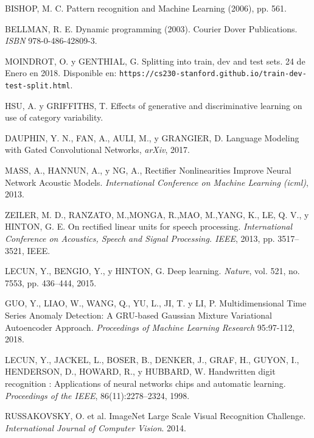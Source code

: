 \begin{thebibliography}{9}
BISHOP, M. C. Pattern recognition and Machine Learning (2006), pp. 561.

 BELLMAN, R. E. Dynamic programming (2003). Courier Dover Publications. \textit{ISBN} 978-0-486-42809-3.

 MOINDROT, O. y GENTHIAL, G. Splitting into train, dev and test sets. 24 de Enero en 2018. Disponible en: \texttt{https://cs230-stanford.github.io/train-dev-test-split.html}.

 HSU, A. y GRIFFITHS, T. Effects of generative and discriminative learning on use of category variability.

 DAUPHIN, Y. N., FAN, A., AULI, M., y GRANGIER, D. Language Modeling with Gated Convolutional Networks, \textit{arXiv}, 2017.

 MASS, A., HANNUN, A., y NG, A., Rectifier Nonlinearities Improve Neural Network Acoustic Models. \textit{International Conference on Machine Learning (icml)}, 2013.

 ZEILER, M. D., RANZATO, M.,MONGA, R.,MAO, M.,YANG, K., LE, Q. V., y HINTON, G. E. On rectified linear units for speech processing. \textit{International Conference on Acoustics, Speech and Signal Processing. IEEE}, 2013, pp. 3517–3521, IEEE.

 LECUN, Y., BENGIO, Y., y HINTON, G. Deep learning. \textit{Nature}, vol. 521, no. 7553, pp. 436–444, 2015.


 GUO, Y., LIAO, W., WANG, Q., YU, L., JI, T. y LI, P. Multidimensional Time Series Anomaly Detection: A GRU-based Gaussian Mixture Variational Autoencoder Approach. \textit{Proceedings of Machine Learning Research} 95:97-112, 2018.

 LECUN, Y., JACKEL, L., BOSER, B., DENKER, J., GRAF, H., GUYON, I., HENDERSON, D., HOWARD, R., y HUBBARD, W. Handwritten digit recognition : Applications of neural networks chips and automatic learning. \textit{Proceedings of the IEEE}, 86(11):2278–2324, 1998.

 RUSSAKOVSKY, O. et al. ImageNet Large Scale Visual Recognition Challenge. \textit{International Journal of Computer Vision}. 2014. 


\end{thebibliography}
